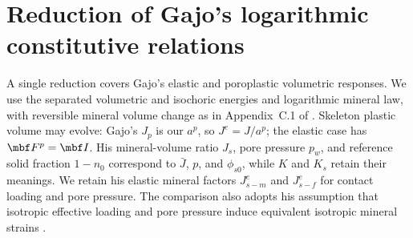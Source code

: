 \section{Reduction of Gajo's logarithmic constitutive relations}
\label{sec:gajo-elastic-equivalence}

A single reduction covers Gajo's elastic and poroplastic volumetric
responses.  We use the separated volumetric and isochoric energies and
logarithmic mineral law, with reversible mineral volume change as in
Appendix~C.1 of \citet{gajo2011}.  Skeleton plastic volume may evolve:
Gajo's \(J_p\) is our \(a^p\), so \(J^e=J/a^p\); the elastic case has
\(\mbf F^p=\mbf I\).  His mineral-volume ratio \(J_s\), pore pressure
\(p_w\), and reference solid fraction \(1-n_0\) correspond to
\(\bar J\), \(p\), and \(\phi_{s0}\), while \(K\) and \(K_s\) retain
their meanings.  We retain his elastic mineral factors \(J^e_{s-m}\) and
\(J^e_{s-f}\) for contact loading and pore pressure.  The comparison also
adopts his assumption that isotropic effective loading and pore pressure
induce equivalent isotropic mineral strains \citep[Sec.~3(c)]{gajo2010}.


